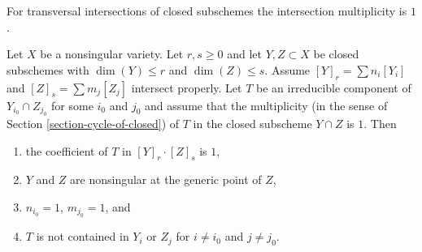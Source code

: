 \noindent
For transversal intersections of closed subschemes the intersection
multiplicity is $1$.

\begin{lemma}
\label{lemma-transversal-subschemes}
Let $X$ be a nonsingular variety. Let $r, s \geq 0$ and let
$Y, Z \subset X$ be closed subschemes with $\dim(Y) \leq r$ and
$\dim(Z) \leq s$. Assume $[Y]_r = \sum n_i[Y_i]$ and
$[Z]_s = \sum m_j[Z_j]$ intersect properly.
Let $T$ be an irreducible component of $Y_{i_0} \cap Z_{j_0}$
for some $i_0$ and $j_0$ and assume that the multiplicity
(in the sense of Section \ref{section-cycle-of-closed}) of $T$
in the closed subscheme $Y \cap Z$ is $1$.
Then
\begin{enumerate}
\item the coefficient of $T$ in $[Y]_r \cdot [Z]_s$ is $1$,
\item $Y$ and $Z$ are nonsingular at the generic point of $Z$,
\item $n_{i_0} = 1$, $m_{j_0} = 1$, and
\item $T$ is not contained in $Y_i$ or $Z_j$ for $i \not = i_0$ and
$j \not = j_0$.
\end{enumerate}
\end{lemma}

